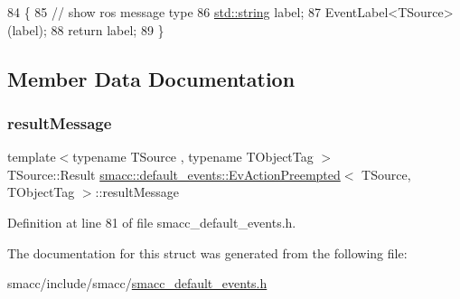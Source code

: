 \begin{DoxyCode}
84   \{
85     \textcolor{comment}{// show ros message type}
86     \hyperlink{namespacetesting_1_1internal_a8e8ff5b11e64078831112677156cb111}{std::string} label;
87     EventLabel<TSource>(label);
88     \textcolor{keywordflow}{return} label;
89   \}
\end{DoxyCode}


\subsection{Member Data Documentation}
\mbox{\label{structsmacc_1_1default__events_1_1EvActionPreempted_a38f3c09c9c672b82b08ea5ff2085280e}} 
\subsubsection{\texorpdfstring{result\+Message}{resultMessage}}
{\footnotesize\ttfamily template$<$typename T\+Source , typename T\+Object\+Tag $>$ \\
T\+Source\+::\+Result \hyperlink{structsmacc_1_1default__events_1_1EvActionPreempted}{smacc\+::default\+\_\+events\+::\+Ev\+Action\+Preempted}$<$ T\+Source, T\+Object\+Tag $>$\+::result\+Message}



Definition at line 81 of file smacc\+\_\+default\+\_\+events.\+h.



The documentation for this struct was generated from the following file\+:\begin{DoxyCompactItemize}
\item 
smacc/include/smacc/\hyperlink{smacc__default__events_8h}{smacc\+\_\+default\+\_\+events.\+h}\end{DoxyCompactItemize}
